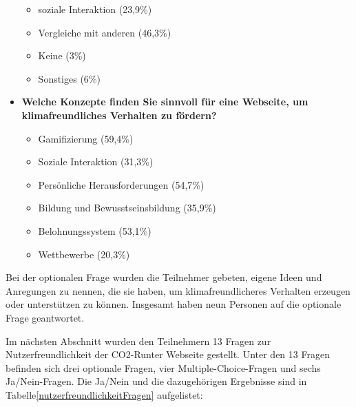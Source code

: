 \begin{itemize}
\begin{itemize}
              \item soziale Interaktion (23,9\%)
              \item Vergleiche mit anderen (46,3\%)
              \item Keine (3\%)
              \item Sonstiges (6\%)
          \end{itemize}
    \item \textbf{Welche Konzepte finden Sie sinnvoll für eine Webseite, um klimafreundliches Verhalten zu fördern?}
          \begin{itemize}
              \item Gamifizierung (59,4\%)
              \item Soziale Interaktion (31,3\%)
              \item Persönliche Herausforderungen (54,7\%)
              \item Bildung und Bewusstseinsbildung (35,9\%)
              \item Belohnungssystem (53,1\%)
              \item Wettbewerbe (20,3\%)
          \end{itemize}
\end{itemize}

Bei der optionalen Frage wurden die Teilnehmer gebeten, eigene Ideen und Anregungen zu nennen, die sie haben, um klimafreundlicheres Verhalten erzeugen oder unterstützen zu können.
Insgesamt haben neun Personen auf die optionale Frage geantwortet.

Im nächsten Abschnitt wurden den Teilnehmern 13 Fragen zur Nutzerfreundlichkeit der CO2-Runter Webseite gestellt.
Unter den 13 Fragen befinden sich drei optionale Fragen, vier Multiple-Choice-Fragen und sechs Ja/Nein-Fragen.
Die Ja/Nein und die dazugehörigen Ergebnisse sind in Tabelle\ref{nutzerfreundlichkeitFragen} aufgelistet:

